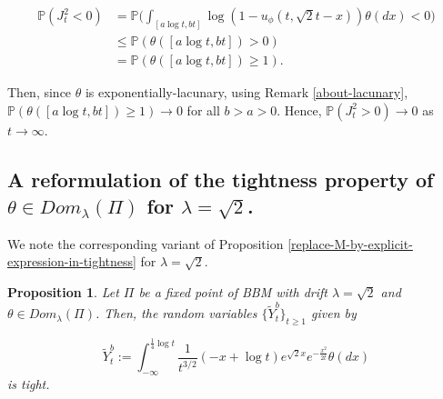 \documentclass[a4paper,reqno]{amsart}%
\newcommand{\1}{\mathbf 1}
\theoremstyle{mine}
\numberwithin{theorem}{section}
\newtheorem{proposition}[theorem]{Proposition}
\numberwithin{equation}{section}
\theoremstyle{remark}
\begin{document}
\begin{align}
    \nonumber\mathbb{P}(J_t^2<0) &= \mathbb{P}\biggl( \int_{[a \log t,bt]}\log(1- u_\phi(t, \sqrt{2} t -x))\theta(dx) <0\biggr) \\
    \nonumber &\leq \mathbb{P}(\theta([a \log t, bt]) >0) \\
    \nonumber &= \mathbb{P}(\theta([a \log t, bt]) \geq 1).
\end{align}

Then, since $\theta$ is exponentially-lacunary, using Remark \ref{about-lacunary}, $\mathbb{P}(\theta([a \log t, bt]) \geq 1) \to 0$ for all $b>a >0$. Hence, $\mathbb{P}(J_t^2>0) \to 0$ as $t\to \infty$. \\


\subsection{A reformulation of the tightness property of $\theta \in Dom_{\lambda}(\Pi)$ for $\lambda = \sqrt{2}$.}


We note the corresponding variant of Proposition \ref{replace-M-by-explicit-expression-in-tightness} for $\lambda = \sqrt{2}$. 

\begin{proposition}\label{replace-M-by-explicit-expression-in-tightness-for-critical}
Let $\Pi$ be a fixed point of BBM with drift $\lambda =\sqrt{2}$ and $\theta \in Dom_{\lambda}(\Pi)$. Then, the random variables $\{\widetilde{Y}_t^b\}_{t\ge 1}$ given by 

\begin{equation}\label{tightness-tilde-Y-for-critical}
\widetilde{Y}_t^b := \int_{-\infty}^{\frac{1}{4} \log t }\frac{1}{t^{3/2}}(-x + \log t)e^{\sqrt{2}x} e^{-\frac{x^2}{2t}} \theta(dx)     
\end{equation}
is tight. 
\end{proposition} 
\end{document}
